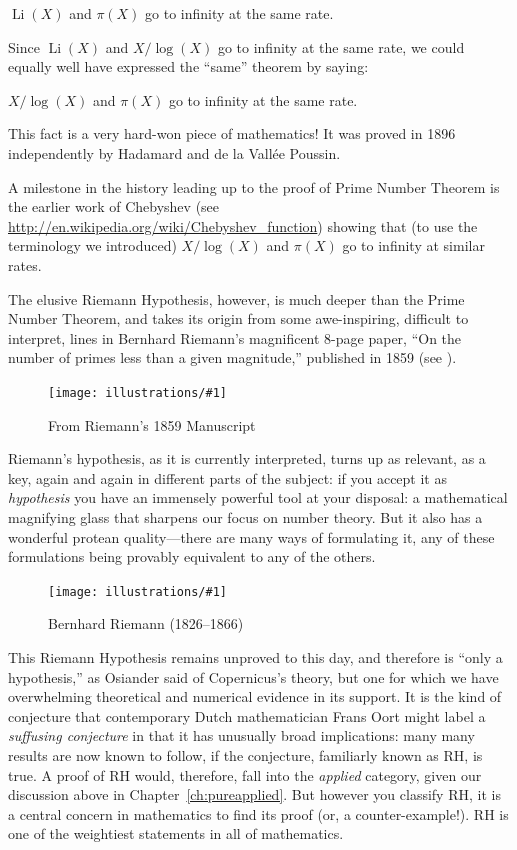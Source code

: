 \documentclass[openany]{book}
\DeclareMathOperator{\Li}{Li}
\newcommand{\ill}[3]{%
   \begin{figure}[H]%
   \vspace{-2ex}
   \centering%
   \texttt{[image: illustrations/\#1]}%
   \caption{#3}%
   \vspace{-2ex}
    \end{figure}}
\theoremstyle{plain}
\theoremstyle{definition}
\newcommand{\RH}{Riemann Hypothesis\index{Riemann Hypothesis}}
\begin{document}
  $\Li(X)$ and $\pi(X)$ go to infinity at the same rate.
   

   Since $\Li(X)$ and $X/\log(X)$ go to infinity at the same rate, we could
   equally well have expressed the ``same'' theorem by saying:

  
   $X/\log(X)$ and $\pi(X)$ go to infinity at the same rate.
   
    
   This fact is a very hard-won piece of mathematics!  It was proved
   in 1896 independently by Hadamard and de la Vall\'{e}e Poussin.


   A milestone in the history leading up to the proof of Prime Number
   Theorem is the earlier work of Chebyshev (see
   \url{http://en.wikipedia.org/wiki/Chebyshev_function}) showing that
   (to use the terminology we introduced) $X/\log(X)$ and $\pi(X)$ go
   to infinity at similar rates.
        

The elusive \RH{}, however, is much deeper than the Prime
Number Theorem, and takes its origin from some awe-inspiring,
difficult to interpret, lines in Bernhard Riemann's magnificent 8-page
paper, ``On the number of primes less than a given magnitude,''
published in 1859
(see ).
 

\ill{riemann_zoom}{1}{From Riemann's 1859 Manuscript\label{fig:riemamn}}




Riemann's hypothesis, as it is currently interpreted, turns up as
relevant, as a key, again and again in different parts of the subject:
if you accept it as {\em hypothesis} you have an immensely powerful
tool at your disposal: a mathematical magnifying glass that sharpens
our focus on number theory. But it also has a wonderful protean
quality---there are many ways of formulating it, any of these
formulations being provably equivalent to any of the others.

\ill{riemann}{.3}{Bernhard Riemann (1826--1866)}


This \RH{} remains unproved to this day, and therefore is ``only a
hypothesis,'' as Osiander said of Copernicus's theory, but one for
which we have overwhelming theoretical and numerical evidence in its
support.  It is the kind of conjecture that contemporary Dutch
mathematician Frans Oort might label a {\em suffusing conjecture} in
that it has unusually broad implications: many many results are now
known to follow, if the conjecture, familiarly known as RH, is true.
A proof of RH would, therefore, fall into the {\em applied} category,
given our discussion above in Chapter~\ref{ch:pureapplied}.  But
however you classify RH, it is a central concern in mathematics to
find its proof (or, a counter-example!).  RH is one of the weightiest
statements in all of mathematics.
\end{document}
